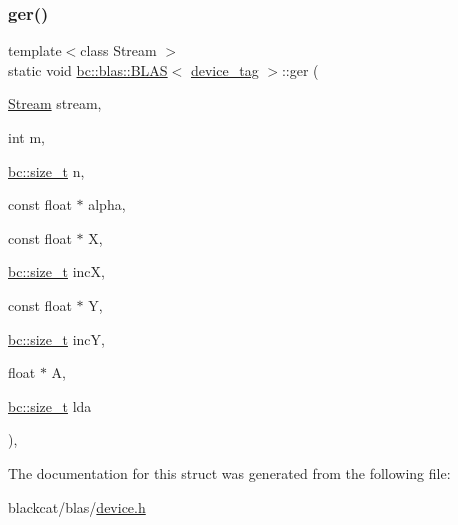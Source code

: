 \subsubsection{\texorpdfstring{ger()}{ger()}}
{\footnotesize\ttfamily template$<$class Stream $>$ \\
static void \hyperlink{structbc_1_1blas_1_1BLAS}{bc\+::blas\+::\+B\+L\+AS}$<$ \hyperlink{structbc_1_1device__tag}{device\+\_\+tag} $>$\+::ger (\begin{DoxyParamCaption}\item[{\hyperlink{classbc_1_1streams_1_1Stream}{Stream}}]{stream,  }\item[{int}]{m,  }\item[{\hyperlink{namespacebc_aaf8e3fbf99b04b1b57c4f80c6f55d3c5}{bc\+::size\+\_\+t}}]{n,  }\item[{const float $\ast$}]{alpha,  }\item[{const float $\ast$}]{X,  }\item[{\hyperlink{namespacebc_aaf8e3fbf99b04b1b57c4f80c6f55d3c5}{bc\+::size\+\_\+t}}]{incX,  }\item[{const float $\ast$}]{Y,  }\item[{\hyperlink{namespacebc_aaf8e3fbf99b04b1b57c4f80c6f55d3c5}{bc\+::size\+\_\+t}}]{incY,  }\item[{float $\ast$}]{A,  }\item[{\hyperlink{namespacebc_aaf8e3fbf99b04b1b57c4f80c6f55d3c5}{bc\+::size\+\_\+t}}]{lda }\end{DoxyParamCaption})\hspace{0.3cm}{\ttfamily [inline]}, {\ttfamily [static]}}



The documentation for this struct was generated from the following file\+:\begin{DoxyCompactItemize}
\item 
blackcat/blas/\hyperlink{blas_2device_8h}{device.\+h}\end{DoxyCompactItemize}
